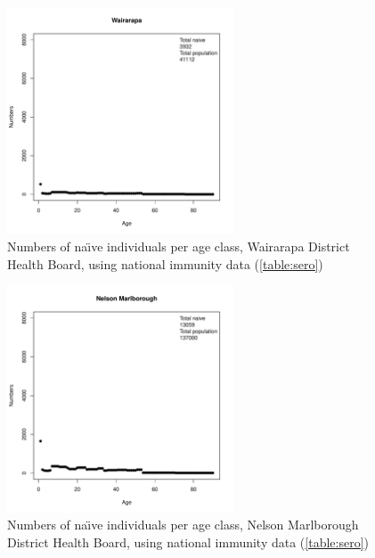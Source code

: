 \documentclass{article}
\begin{document}
\begin{figure}[H]
     \begin{center}
     \includegraphics[width=0.6\textwidth]{dhb15.pdf}
     \end{center}
     \caption{Numbers of na\"{\i}ve individuals per age class, Wairarapa District Health Board, using national immunity data (\autoref{table:sero})}
     \label{fig:Wairarapa}
\end{figure}

\begin{figure}[H]
     \begin{center}
     \includegraphics[width=0.6\textwidth]{dhb16.pdf}
     \end{center}
     \caption{Numbers of na\"{\i}ve individuals per age class, Nelson Marlborough District Health Board, using national immunity data (\autoref{table:sero})}
     \label{fig:NelsonMarlborough}
\end{figure}
\end{document}

